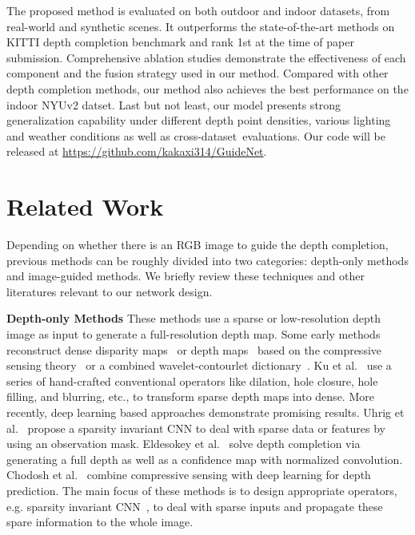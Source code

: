 \documentclass[journal]{IEEEtran}
\begin{document}
The proposed method is evaluated on both outdoor and indoor datasets, from real-world and synthetic scenes.
It outperforms the state-of-the-art methods on KITTI depth completion benchmark and rank 1st at the time of paper submission.
Comprehensive ablation studies demonstrate the effectiveness of each component and the fusion strategy used in our method.  
Compared with other depth completion methods, our method also achieves the best performance on the indoor NYUv2 datset. 
Last but not least, our model presents strong generalization capability under different depth point densities, various lighting and weather conditions as well as cross-dataset~evaluations.
Our code will be released at \url{https://github.com/kakaxi314/GuideNet}.
 

\section{Related Work}
Depending on whether there is an RGB image to guide the depth completion, previous methods can be roughly divided into two categories: depth-only methods and image-guided methods.
We briefly review these techniques and other literatures relevant to our network design.

{\bf Depth-only Methods} These methods use a sparse or low-resolution depth image as input to generate a full-resolution depth map.
Some early methods reconstruct dense disparity maps~\cite{dense_disparity} or depth maps~\cite{sparse_sample} based on the compressive sensing theory~\cite{dense_disparity} or a combined wavelet-contourlet dictionary~\cite{sparse_sample}.
Ku et al.~\cite{defense_classical} use a series of hand-crafted conventional operators like dilation, hole closure, hole filling, and blurring, etc., to transform sparse depth maps into dense.
More recently, deep learning based approaches demonstrate promising results.
Uhrig et al.~\cite{sparsity_cnn} propose a sparsity invariant CNN to deal with sparse data or features by using an observation mask.
Eldesokey et al.~\cite{propagating_confidences} solve depth completion via generating a full depth as well as a confidence map with normalized convolution.
Chodosh et al.~\cite{compress_sensing_convolution} combine compressive sensing with deep learning for depth prediction.
The main focus of these methods is to design appropriate operators,
e.g. sparsity invariant CNN~\cite{sparsity_cnn}, to deal with sparse inputs and propagate these spare information to the whole image. 
\end{document}
